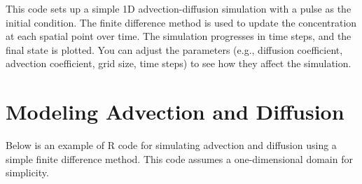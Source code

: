 \documentclass{tufte-handout}\usepackage[]{graphicx}\usepackage[]{xcolor}
\begin{document}
This code sets up a simple 1D advection-diffusion simulation with a pulse as the initial condition. The finite difference method is used to update the concentration at each spatial point over time. The simulation progresses in time steps, and the final state is plotted. You can adjust the parameters (e.g., diffusion coefficient, advection coefficient, grid size, time steps) to see how they affect the simulation.

\section{Modeling Advection and Diffusion}

Below is an example of R code for simulating advection and diffusion using a simple finite difference method. This code assumes a one-dimensional domain for simplicity.
\end{document}
